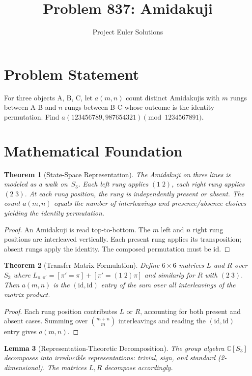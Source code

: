 \documentclass[11pt]{article}
\title{Problem 837: Amidakuji}
\author{Project Euler Solutions}
\date{}
\newtheorem{theorem}{Theorem}
\newtheorem{lemma}[theorem]{Lemma}
\begin{document}
\maketitle

\section{Problem Statement}

For three objects A, B, C, let $a(m,n)$ count distinct Amidakujis with $m$ rungs between A-B and $n$ rungs between B-C whose outcome is the identity permutation. Find $a(123456789, 987654321) \pmod{1234567891}$.

\section{Mathematical Foundation}

\begin{theorem}[State-Space Representation]
The Amidakuji on three lines is modeled as a walk on~$S_3$. Each left rung applies $(1\;2)$, each right rung applies $(2\;3)$. At each rung position, the rung is independently present or absent. The count $a(m,n)$ equals the number of interleavings and presence/absence choices yielding the identity permutation.
\end{theorem}

\begin{proof}
An Amidakuji is read top-to-bottom. The $m$ left and $n$ right rung positions are interleaved vertically. Each present rung applies its transposition; absent rungs apply the identity. The composed permutation must be $\mathrm{id}$.
\end{proof}

\begin{theorem}[Transfer Matrix Formulation]
Define $6\times 6$ matrices $L$ and $R$ over $S_3$ where $L_{\pi,\pi'}=[\pi'=\pi]+[\pi'=(1\;2)\pi]$ and similarly for $R$ with $(2\;3)$. Then $a(m,n)$ is the $(\mathrm{id},\mathrm{id})$ entry of the sum over all interleavings of the matrix product.
\end{theorem}

\begin{proof}
Each rung position contributes $L$ or $R$, accounting for both present and absent cases. Summing over $\binom{m+n}{m}$ interleavings and reading the $(\mathrm{id},\mathrm{id})$ entry gives $a(m,n)$.
\end{proof}

\begin{lemma}[Representation-Theoretic Decomposition]
The group algebra $\mathbb{C}[S_3]$ decomposes into irreducible representations: trivial, sign, and standard (2-dimensional). The matrices $L,R$ decompose accordingly.
\end{lemma}
\end{document}
